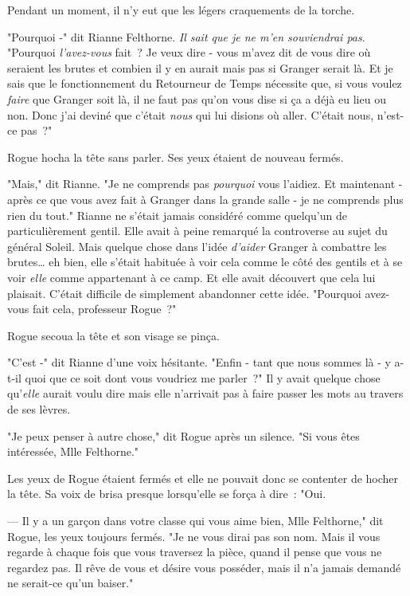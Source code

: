 Pendant un moment, il n'y eut que les légers craquements de la torche.

"Pourquoi -" dit Rianne Felthorne. \emph{Il sait que je ne m'en souviendrai pas}. "Pourquoi \emph{l'avez-vous} fait~? Je veux dire - vous m'avez dit de vous dire où seraient les brutes et combien il y en aurait mais pas si Granger serait là. Et je sais que le fonctionnement du Retourneur de Temps nécessite que, si vous voulez \emph{faire} que Granger soit là, il ne faut pas qu'on vous dise si ça a déjà eu lieu ou non. Donc j'ai deviné que c'était \emph{nous} qui lui disions où aller. C'était nous, n'est-ce pas~?"

Rogue hocha la tête sans parler. Ses yeux étaient de nouveau fermés.

"Mais," dit Rianne. "Je ne comprends pas \emph{pourquoi} vous l'aidiez. Et maintenant - après ce que vous avez fait à Granger dans la grande salle - je ne comprends plus rien du tout." Rianne ne s'était jamais considéré comme quelqu'un de particulièrement gentil. Elle avait à peine remarqué la controverse au sujet du général Soleil. Mais quelque chose dans l'idée \emph{d'aider} Granger à combattre les brutes… eh bien, elle s'était habituée à voir cela comme le côté des gentils et à se voir \emph{elle} comme appartenant à ce camp. Et elle avait découvert que cela lui plaisait. C'était difficile de simplement abandonner cette idée. "Pourquoi avez-vous fait cela, professeur Rogue~?"

Rogue secoua la tête et son visage se pinça.

"C'est -" dit Rianne d'une voix hésitante. "Enfin - tant que nous sommes là - y a-t-il quoi que ce soit dont vous voudriez me parler~?" Il y avait quelque chose qu'\emph{elle} aurait voulu dire mais elle n'arrivait pas à faire passer les mots au travers de ses lèvres.

"Je peux penser à autre chose," dit Rogue après un silence. "Si vous êtes intéressée, Mlle Felthorne."

Les yeux de Rogue étaient fermés et elle ne pouvait donc se contenter de hocher la tête. Sa voix de brisa presque lorsqu'elle se força à dire~: "Oui.

--- Il y a un garçon dans votre classe qui vous aime bien, Mlle Felthorne," dit Rogue, les yeux toujours fermés. "Je ne vous dirai pas son nom. Mais il vous regarde à chaque fois que vous traversez la pièce, quand il pense que vous ne regardez pas. Il rêve de vous et désire vous posséder, mais il n'a jamais demandé ne serait-ce qu'un baiser."

